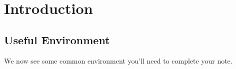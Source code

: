 \chapter{Introduction}
\section{Useful Environment}
We now see some common environment you'll need to complete your note.

